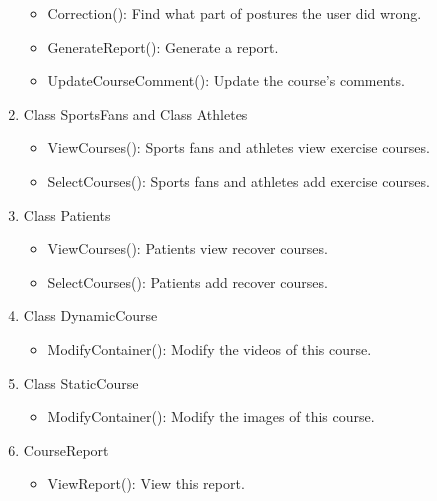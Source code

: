 \documentclass[16pt]{scrreprt}
\begin{document}
\begin{enumerate}
\begin{itemize}
        \item Correction(): Find what part of postures the user did wrong.
        \item GenerateReport(): Generate a report.
        \item UpdateCourseComment(): Update the course's comments.
    \end{itemize}
    \item Class SportsFans and Class Athletes
    \begin{itemize}
        \item ViewCourses(): Sports fans and athletes view exercise courses.
        \item SelectCourses(): Sports fans and athletes add exercise courses.
    \end{itemize}
    \item Class Patients
    \begin{itemize}
        \item ViewCourses(): Patients view recover courses.
        \item SelectCourses(): Patients add recover courses.
    \end{itemize}
    \item Class DynamicCourse
    \begin{itemize}
        \item ModifyContainer(): Modify the videos of this course.
    \end{itemize}
    \item Class StaticCourse
    \begin{itemize}
        \item ModifyContainer(): Modify the images of this course.
    \end{itemize}
    \item CourseReport
    \begin{itemize}
        \item ViewReport(): View this report.
    \end{itemize}
\end{enumerate}
\end{document}
